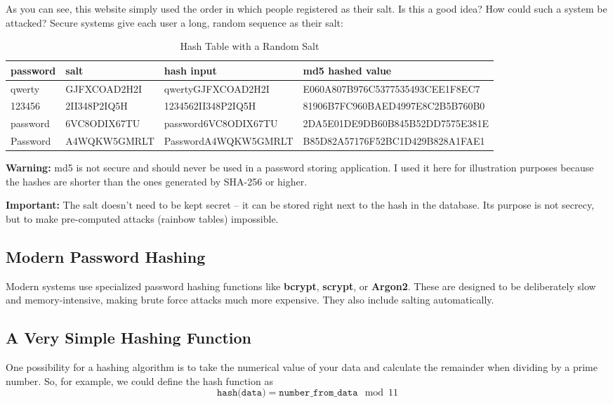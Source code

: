 \documentclass[11pt,a4paper]{report}
\begin{document}
As you can see, this website simply used the order in which people registered as their salt.
Is this a good idea? How could such a system be attacked?
Secure systems give each user a long, random sequence as their salt:

\begin{table}[h]
\scriptsize
\centering
\begin{tabular}{|l|l|l|l|}
\hline
password & salt & hash input & md5 hashed value \\
\hline
qwerty & GJFXCOAD2H2I & qwertyGJFXCOAD2H2I & E060A807B976C5377535493CEE1F8EC7 \\
123456 & 2II348P2IQ5H & 1234562II348P2IQ5H & 81906B7FC960BAED4997E8C2B5B760B0 \\
password & 6VC8ODIX67TU & password6VC8ODIX67TU & 2DA5E01DE9DB60B845B52DD7575E381E \\
Password & A4WQKW5GMRLT & PasswordA4WQKW5GMRLT & B85D82A57176F52BC1D429B828A1FAE1 \\
\hline
\end{tabular}
\caption{Hash Table with a Random Salt}
\end{table}


\textbf{Warning:} md5 is not secure and should never be used in a password storing application.
I used it here for illustration purposes because the hashes are shorter than the ones generated by SHA-256 or higher.

\textbf{Important:} The salt doesn't need to be kept secret -- it can be stored right next to the hash in the database. Its purpose is not secrecy, but to make pre-computed attacks (rainbow tables) impossible.

\subsection{Modern Password Hashing}

Modern systems use specialized password hashing functions like \textbf{bcrypt}, \textbf{scrypt}, or \textbf{Argon2}. These are designed to be deliberately slow and memory-intensive, making brute force attacks much more expensive. They also include salting automatically.

\subsection{A Very Simple Hashing Function}

One possibility for a hashing algorithm is to take the numerical value of your data and calculate the remainder when dividing by a prime number.
So, for example, we could define the hash function as
\[
\texttt{hash(data)} = \texttt{number\_from\_data} \mod 11
\]
\end{document}
